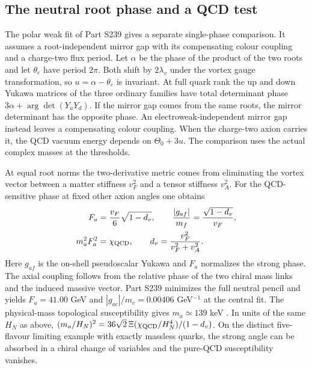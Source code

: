 \documentclass[aps,prd,reprint,onecolumn,nofootinbib,amsmath,amssymb]{revtex4-2}
\begin{document}
\subsection{The neutral root phase and a QCD test}
The polar weak fit of Part S239 gives a separate single-phase comparison. It assumes a root-independent mirror gap with its compensating colour coupling and a charge-two flux period. Let $\alpha$ be the phase of the product of the two roots and let $\theta_e$ have period $2\pi$. Both shift by $2\lambda_v$ under the vortex gauge transformation, so $u=\alpha-\theta_e$ is invariant. At full quark rank the up and down Yukawa matrices of the three ordinary families have total determinant phase $3\alpha+\arg\det(Y_uY_d)$. If the mirror gap comes from the same roots, the mirror determinant has the opposite phase. An electroweak-independent mirror gap instead leaves a compensating colour coupling. When the charge-two axion carries it, the QCD vacuum energy depends on $\Theta_0+3u$. The comparison uses the actual complex masses at the thresholds.

At equal root norms the two-derivative metric comes from eliminating the vortex vector between a matter stiffness $v_F^2$ and a tensor stiffness $v_A^2$. For the QCD-sensitive phase at fixed other axion angles one obtains
\begin{equation}
 \begin{split}
 F_a&=\frac{v_F}{6}\sqrt{1-d_v},\qquad
 \frac{|g_{af}|}{m_f}=\frac{\sqrt{1-d_v}}{v_F},\\
 m_a^2F_a^2&=\chi_{\rm QCD},\qquad
 d_v=\frac{v_F^2}{v_F^2+v_A^2}.
 \end{split}
\end{equation}
Here $g_{af}$ is the on-shell pseudoscalar Yukawa and $F_a$ normalizes the strong phase. The axial coupling follows from the relative phase of the two chiral mass links and the induced massive vector. Part S239 minimizes the full neutral pencil and yields $F_a=41.00$ GeV and $|g_{ac}|/m_c=0.00406$ GeV$^{-1}$ at the central fit. The physical-mass topological susceptibility gives $m_a\simeq139$ keV \cite{Gorghetto2019Axion}. In units of the same $H_N$ as above, $(m_a/H_N)^2=36\sqrt2\,\Xi(\chi_{\rm QCD}/H_N^4)/(1-d_v)$. On the distinct five-flavour limiting example with exactly massless quarks, the strong angle can be absorbed in a chiral change of variables and the pure-QCD susceptibility vanishes.
\end{document}
